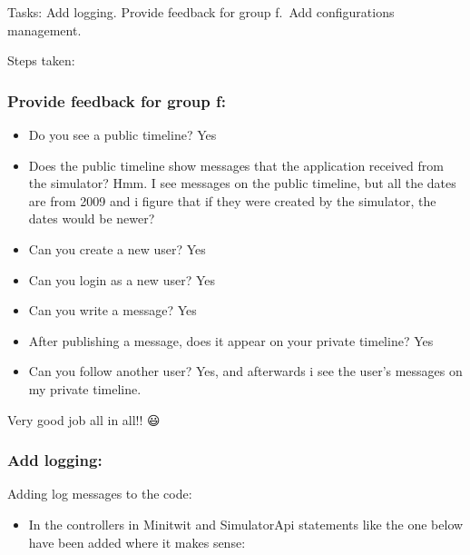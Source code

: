 Tasks: Add logging. Provide feedback for group f.~Add configurations
management.

Steps taken:

\subsubsection{Provide feedback for group f:}
\label{log:provide-feedback-for-group-f}

\begin{itemize}
    \item Do you see a public timeline? Yes
    \item Does the public timeline show messages that the application received from the simulator? Hmm. I see messages on the public timeline, but all the dates are from 2009 and i figure that if they were created by the simulator, the dates would be newer?
    \item Can you create a new user? Yes
    \item Can you login as a new user? Yes
    \item Can you write a message? Yes
    \item After publishing a message, does it appear on your private timeline? Yes
    \item Can you follow another user? Yes, and afterwards i see the user's messages on my private timeline.
\end{itemize}

Very good job all in all!! 😃

\subsubsection{Add logging:}
\label{log:add-logging}

Adding log messages to the code:

\begin{itemize}
    \item In the controllers in Minitwit and SimulatorApi statements like the one below have been added where it makes sense:
\end{itemize}



